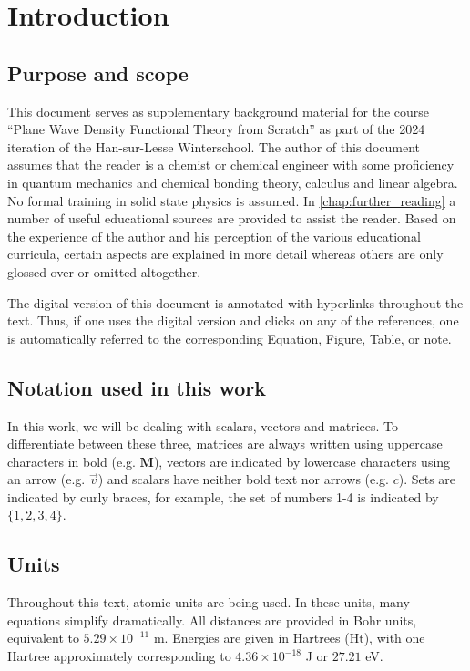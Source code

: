 %
%
%
\section{Introduction}

%
%
%
\subsection{Purpose and scope}

This document serves as supplementary background material for the course ``Plane Wave Density Functional Theory from Scratch'' as part of the 2024 iteration of the Han-sur-Lesse Winterschool. The author of this document assumes that the reader is a chemist or chemical engineer with some proficiency in quantum mechanics and chemical bonding theory, calculus and linear algebra. No formal training in solid state physics is assumed. In \cref{chap:further_reading} a number of useful educational sources are provided to assist the reader. Based on the experience of the author and his perception of the various educational curricula, certain aspects are explained in more detail whereas others are only glossed over or omitted altogether.

The digital version of this document is annotated with hyperlinks throughout the text. Thus, if one uses the digital version and clicks on any of the references, one is automatically referred to the corresponding Equation, Figure, Table, or note.

%
%
%
\subsection{Notation used in this work}

In this work, we will be dealing with scalars, vectors and matrices. To differentiate between these three, matrices are always written using uppercase characters in bold (e.g. $\mathbf{M}$), vectors are indicated by lowercase characters using an arrow (e.g. $\vec{v}$) and scalars have neither bold text nor arrows (e.g. $c$). Sets are indicated by curly braces, for example, the set of numbers 1-4 is indicated by $\{ 1,2,3,4 \}$.

%
%
%
\subsection{Units}
Throughout this text, atomic units are being used.\cite{szabo} In these units, many equations simplify dramatically. All distances are provided in Bohr units, equivalent to $5.29 \times 10^{-11}$ m. Energies are given in Hartrees (Ht), with one Hartree approximately corresponding to $4.36 \times 10^{-18}$ J or $27.21$ eV.

